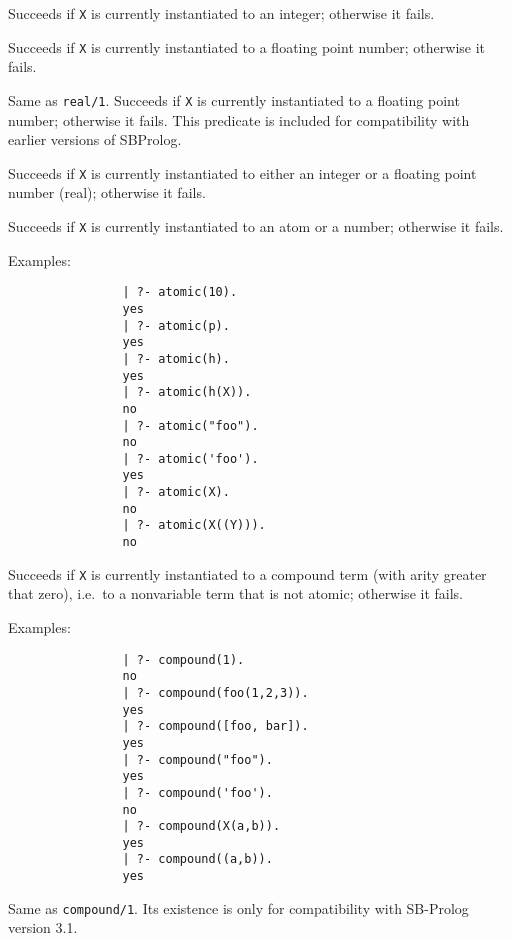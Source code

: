 \begin{description}
    Succeeds if {\tt X} is currently instantiated to an integer; 
    otherwise it fails. 

    Succeeds if {\tt X} is currently instantiated to a floating point number;
    otherwise it fails. 

    Same as {\tt real/1}. Succeeds if {\tt X} is currently instantiated 
    to a floating point number; otherwise it fails.  This predicate is 
    included for compatibility with earlier versions of SBProlog.
	
    Succeeds if {\tt X} is currently instantiated to either an integer or 
    a floating point number (real); otherwise it fails.

    Succeeds if {\tt X} is currently instantiated to an atom or a number;
    otherwise it fails.

    Examples:
    {\footnotesize
     \begin{verbatim}
                | ?- atomic(10).
                yes
                | ?- atomic(p).
                yes
                | ?- atomic(h).
                yes
                | ?- atomic(h(X)).
                no
                | ?- atomic("foo").
                no
                | ?- atomic('foo').
                yes
                | ?- atomic(X).
                no
                | ?- atomic(X((Y))).
                no
     \end{verbatim}}

    Succeeds if {\tt X} is currently instantiated to a compound term (with 
    arity greater that zero), i.e.\ to a nonvariable term that is not atomic;
    otherwise it fails.

    Examples:
    {\footnotesize
     \begin{verbatim}
                | ?- compound(1).
                no
                | ?- compound(foo(1,2,3)).
                yes
                | ?- compound([foo, bar]).
                yes
                | ?- compound("foo").
                yes
                | ?- compound('foo').
                no
                | ?- compound(X(a,b)).
                yes
                | ?- compound((a,b)).
                yes	
     \end{verbatim}}

    Same as {\tt compound/1}\@. Its existence is only for compatibility 
    with SB-Prolog version 3.1.


\end{description}
